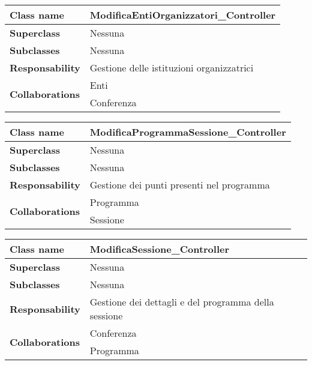 \begin{table}[h!]
	\begin{tabular}{|l|l|}
		\hline 
		\textbf{Class name} & ModificaEntiOrganizzatori\_Controller
		\\ \hline
		\textbf{Superclass} & Nessuna
		\\ \hline
		\multirow{1}{*}{\textbf{Subclasses}} & Nessuna
		\\ \hline
		\textbf{Responsability} & Gestione delle istituzioni organizzatrici
		\\ \hline
		\multirow{2}{*}{\textbf{Collaborations}} & Enti \\
		& Conferenza		\\ \hline
	\end{tabular}
\end{table}
\begin{table}[h!]
	\begin{tabular}{|l|l|}
		\hline 
		\textbf{Class name} & ModificaProgrammaSessione\_Controller
		\\ \hline
		\textbf{Superclass} & Nessuna
		\\ \hline
		\multirow{1}{*}{\textbf{Subclasses}} & Nessuna
		\\ \hline
		\textbf{Responsability} & Gestione dei punti presenti nel programma
		\\ \hline
		\multirow{2}{*}{\textbf{Collaborations}} & Programma \\
		& Sessione 		\\ \hline
	\end{tabular}
\end{table}
\begin{table}[h!]
	\begin{tabular}{|l|l|}
		\hline 
		\textbf{Class name} & ModificaSessione\_Controller
		\\ \hline
		\textbf{Superclass} & Nessuna
		\\ \hline
		\multirow{1}{*}{\textbf{Subclasses}} & Nessuna
		\\ \hline
		\textbf{Responsability} & Gestione dei dettagli e del programma della sessione
		\\ \hline
		\multirow{2}{*}{\textbf{Collaborations}} & Conferenza \\
		& Programma \\ \hline
	\end{tabular}
\end{table}
